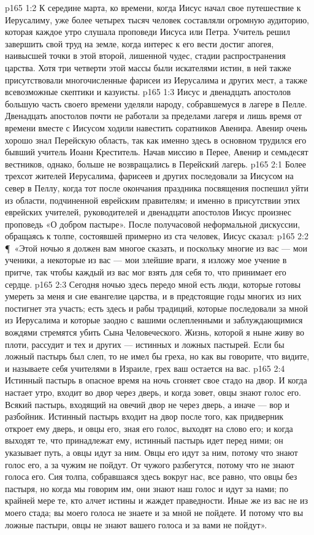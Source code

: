 \vs p165 1:2 К середине марта, ко времени, когда Иисус начал свое путешествие к Иерусалиму, уже более четырех тысяч человек составляли огромную аудиторию, которая каждое утро слушала проповеди Иисуса или Петра. Учитель решил завершить свой труд на земле, когда интерес к его вести достиг апогея, наивысшей точки в этой второй, лишенной чудес, стадии распространения царства. Хотя три четверти этой массы были искателями истин, в ней также присутствовали многочисленные фарисеи из Иерусалима и других мест, а также всевозможные скептики и казуисты.
\vs p165 1:3 Иисус и двенадцать апостолов большую часть своего времени уделяли народу, собравшемуся в лагере в Пелле. Двенадцать апостолов почти не работали за пределами лагеря и лишь время от времени вместе с Иисусом ходили навестить соратников Авенира. Авенир очень хорошо знал Перейскую область, так как именно здесь в основном трудился его бывший учитель Иоанн Креститель. Начав миссию в Перее, Авенир и семьдесят вестников, однако, больше не возвращались в Перейский лагерь.
\vs p165 2:1 Более трехсот жителей Иерусалима, фарисеев и других последовали за Иисусом на север в Пеллу, когда тот после окончания праздника посвящения поспешил уйти из области, подчиненной еврейским правителям; и именно в присутствии этих еврейских учителей, руководителей и двенадцати апостолов Иисус произнес проповедь «О добром пастыре». После получасовой неформальной дискуссии, обращаясь к толпе, состоявшей примерно из ста человек, Иисус сказал:
\vs p165 2:2 \P\ «Этой ночью я должен вам многое сказать, и поскольку многие из вас --- мои ученики, а некоторые из вас --- мои злейшие враги, я изложу мое учение в притче, так чтобы каждый из вас мог взять для себя то, что принимает его сердце.
\vs p165 2:3 Сегодня ночью здесь передо мной есть люди, которые готовы умереть за меня и сие евангелие царства, и в предстоящие годы многих из них постигнет эта участь; есть здесь и рабы традиций, которые последовали за мной из Иерусалима и которые заодно с вашими ослепленными и заблуждающимися вождями стремятся убить Сына Человеческого. Жизнь, которой я ныне живу во плоти, рассудит и тех и других --- истинных и ложных пастырей. Если бы ложный пастырь был слеп, то не имел бы греха, но как вы говорите, что видите, и называете себя учителями в Израиле, грех ваш остается на вас.
\vs p165 2:4 Истинный пастырь в опасное время на ночь сгоняет свое стадо на двор. И когда настает утро, входит во двор через дверь, и когда зовет, овцы знают голос его. Всякий пастырь, входящий на овечий двор не через дверь, а иначе --- вор и разбойник. Истинный пастырь входит на двор после того, как придверник откроет ему дверь, и овцы его, зная его голос, выходят на слово его; и когда выходят те, что принадлежат ему, истинный пастырь идет перед ними; он указывает путь, а овцы идут за ним. Овцы его идут за ним, потому что знают голос его, а за чужим не пойдут. От чужого разбегутся, потому что не знают голоса его. Сия толпа, собравшаяся здесь вокруг нас, все равно, что овцы без пастыря, но когда мы говорим им, они знают наш голос и идут за нами; по крайней мере те, кто алчет истины и жаждет праведности. Иные же из вас не из моего стада; вы моего голоса не знаете и за мной не пойдете. И потому что вы ложные пастыри, овцы не знают вашего голоса и за вами не пойдут».
